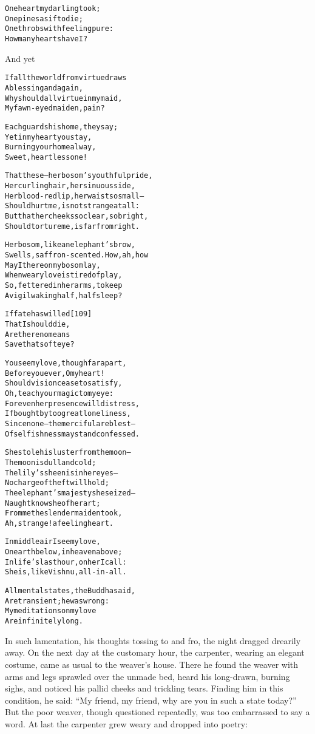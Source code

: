 \documentclass{article}
\renewenvironment{verbatim}{\begin{alltt}\normalfont\begin{centering}}{\end{centering}\end{alltt}}
\begin{document}
\begin{verbatim}
One heart my darling took;
    One pines as if to die;
One throbs with feeling pure:
    How many hearts have I?
\end{verbatim}
And yet

\begin{verbatim}
If all the world from virtue draws
    A blessing and a gain,
Why should all virtue in my maid,
    My fawn-eyed maiden, pain?

Each guards his home, they say;
Yet in my heart you stay,
Burning your home alway,
Sweet, heartless one!

That these--her bosom's youthful pride,
Her curling hair, her sinuous side,
Her blood-red lip, her waist so small--
Should hurt me, is not strange at all:
But that her cheeks so clear, so bright,
Should torture me, is far from right.

Her bosom, like an elephant's brow,
Swells, saffron-scented. How, ah, how
May I thereon my bosom lay,
When weary love is tired of play,
So, fettered in her arms, to keep
A vigil waking half, half sleep?

If fate has willed                                      [109]
    That I should die,
Are there no means
    Save that soft eye?

You see my love, though far apart,
Before you ever, O my heart!
Should vision cease to satisfy,
Oh, teach your magic to my eye:
For even her presence will distress,
If bought by too great loneliness,
Since none--the merciful are blest--
Of selfishness may stand confessed.

She stole his luster from the moon--
    The moon is dull and cold;
The lily's sheen is in her eyes--
    No charge of theft will hold;
The elephant's majesty she seized--
    Naught knows he of her art;
From me the slender maiden took,
    Ah, strange! a feeling heart.

In middle air I see my love,
On earth below, in heaven above;
In life's last hour, on her I call:
She is, like Vishnu, all-in-all.

All mental states, the Buddha said,
    Are transient; he was wrong:
My meditations on my love
    Are infinitely long.
\end{verbatim}
In such lamentation, his thoughts tossing to and fro, the night
dragged drearily away. On the next day at the customary hour, the
carpenter, wearing an elegant costume, came as usual to the
weaver's house. There he found the weaver with arms and legs
sprawled over the unmade bed, heard his long-drawn, burning sighs,
and noticed his pallid cheeks and trickling tears. Finding him in
this condition, he said:
``My friend, my friend, why are you in such a state today?'' But
the poor weaver, though questioned repeatedly, was too embarrassed
to say a word. At last the carpenter grew weary and dropped into
poetry:
\end{document}
